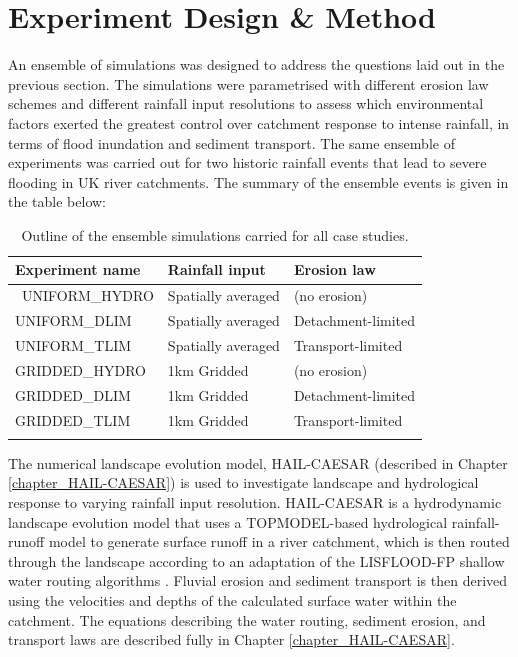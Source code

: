 \section{Experiment Design \& Method}
An ensemble of simulations was designed to address the questions laid out in the previous section. The simulations were parametrised with different erosion law schemes and different rainfall input resolutions to assess which environmental factors exerted the greatest control over catchment response to intense rainfall, in terms of flood inundation and sediment transport. The same ensemble of experiments was carried out for two historic rainfall events that lead to severe flooding in UK river catchments. The summary of the ensemble events is given in the table below:

\begin{table}
\begin{tabular}{lll}
\\
\textbf{Experiment name}   & \textbf{Rainfall input} & \textbf{Erosion law}  \\
\hline \
UNIFORM\_HYDRO  &  Spatially averaged   & (no erosion) \\
UNIFORM\_DLIM      &  Spatially averaged   & Detachment-limited \\
UNIFORM\_TLIM       &  Spatially averaged   & Transport-limited \\

GRIDDED\_HYDRO  &  1km Gridded   & (no erosion) \\
GRIDDED\_DLIM      &  1km Gridded  & Detachment-limited \\
GRIDDED\_TLIM       &  1km Gridded   & Transport-limited \\
\hline \\ 
\end{tabular} 
\caption{Outline of the ensemble simulations carried for all case studies.}
\label{table_ensemble_experiments}
\end{table}

The numerical landscape evolution model, HAIL-CAESAR (described in Chapter \ref{chapter_HAIL-CAESAR}) is used to investigate landscape and hydrological response to varying rainfall input resolution. HAIL-CAESAR is a hydrodynamic landscape evolution model that uses a TOPMODEL-based hydrological rainfall-runoff model to generate surface runoff in a river catchment, which is then routed through the landscape according to an adaptation of the LISFLOOD-FP shallow water routing algorithms \citep{bates2010simple}. Fluvial erosion and sediment transport is then derived using the velocities and depths of the calculated surface water within the catchment. The equations describing the water routing, sediment erosion, and transport laws are described fully in Chapter \ref{chapter_HAIL-CAESAR}.

